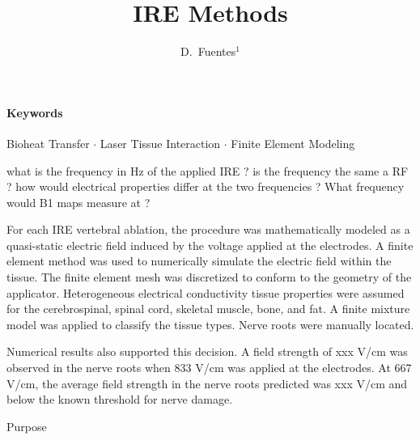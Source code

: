 \documentclass{article}
\begin{document}
\title{\bf \Large
IRE Methods
}

\author{ D.~Fuentes$^1$
}




\maketitle

\paragraph{Keywords} Bioheat Transfer $\cdot$ 
                     Laser Tissue Interaction $\cdot$ 
                     Finite Element Modeling

{\color{red} what is the frequency in Hz of the applied IRE ? is the
frequency the same a RF ? how would electrical properties differ at the two
frequencies ? What frequency would B1 maps measure at ? }

For each IRE vertebral ablation, the procedure was mathematically modeled as
a quasi-static electric field induced by the voltage applied at the
electrodes. A finite element method was used to numerically simulate the
electric field within the tissue. The finite element mesh was discretized to
conform to the geometry of the applicator. Heterogeneous electrical
conductivity tissue properties were assumed for the cerebrospinal, spinal
cord, skeletal muscle, bone, and fat. A finite mixture model was applied to
classify the tissue types. Nerve roots were manually located.

Numerical results also supported this decision. A field strength of xxx
V/cm was observed in the nerve roots when 833 V/cm was applied at the
electrodes. At 667 V/cm, the average field strength in the nerve roots
predicted was xxx V/cm and below the known threshold for nerve damage. 


Purpose
\end{document}

